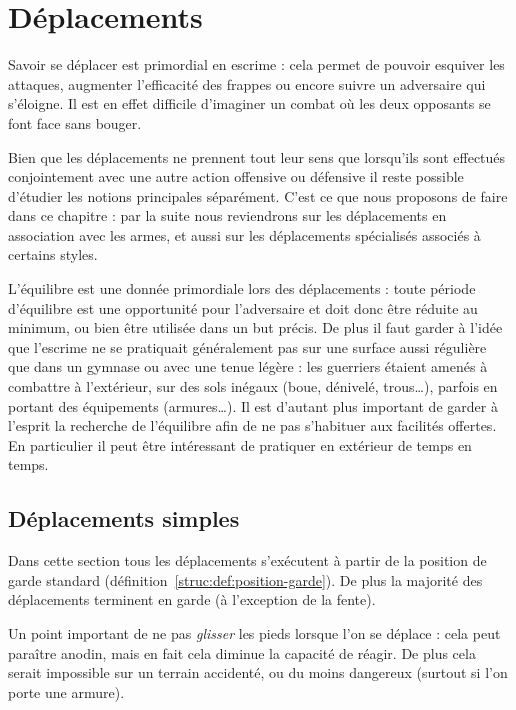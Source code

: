 \chapter{Déplacements}
\label{chap:structure:déplacements}


Savoir se déplacer est primordial en escrime : cela permet de pouvoir esquiver les attaques, augmenter l'efficacité des frappes ou encore suivre un adversaire qui s'éloigne.
Il est en effet difficile d'imaginer un combat où les deux opposants se font face sans bouger.

Bien que les déplacements ne prennent tout leur sens que lorsqu'ils sont effectués conjointement avec une autre action offensive ou défensive il reste possible d'étudier les notions principales séparément.
C'est ce que nous proposons de faire dans ce chapitre : par la suite nous reviendrons sur les déplacements en association avec les armes, et aussi sur les déplacements spécialisés associés à certains styles.

L'équilibre est une donnée primordiale lors des déplacements : toute période d'équilibre est une opportunité pour l'adversaire et doit donc être réduite au minimum, ou bien être utilisée dans un but précis.
De plus il faut garder à l'idée que l'escrime ne se pratiquait généralement pas sur une surface aussi régulière que dans un gymnase ou avec une tenue légère : les guerriers étaient amenés à combattre à l'extérieur, sur des sols inégaux (boue, dénivelé, trous…), parfois en portant des équipements (armures…).
Il est d'autant plus important de garder à l'esprit la recherche de l'équilibre afin de ne pas s'habituer aux facilités offertes.
En particulier il peut être intéressant de pratiquer en extérieur de temps en temps.


\section{Déplacements simples}



Dans cette section tous les déplacements s'exécutent à partir de la position de garde standard (définition~\ref{struc:def:position-garde}).
De plus la majorité des déplacements terminent en garde (à l'exception de la fente).

Un point important de ne pas \emph{glisser} les pieds lorsque l'on se déplace : cela peut paraître anodin, mais en fait cela diminue la capacité de réagir.
De plus cela serait impossible sur un terrain accidenté, ou du moins dangereux (surtout si l'on porte une armure).


